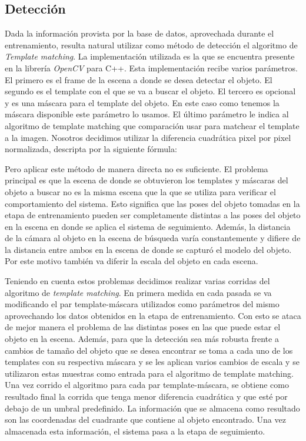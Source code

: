 \subsection{Detección}
Dada la información provista por la base de datos, aprovechada durante el entrenamiento, resulta natural utilizar como método de detección el algoritmo de \textit{Template matching}.  La implementación utilizada es la que se encuentra presente en la librería \textit{OpenCV} para C++. Esta implementación recibe varios parámetros. El primero es el frame de la escena a donde se desea detectar el objeto. El segundo es el template con el que se va a buscar el objeto. El tercero es opcional y es una máscara para el template del objeto. En este caso como tenemos la máscara disponible este parámetro lo usamos. El último parámetro le indica al algoritmo de template matching que comparación usar para matchear el template a la imagen. Nosotros decidimos utilizar la diferencia cuadrática pixel por pixel normalizada, descripta por la siguiente fórmula:


Pero aplicar este método de manera directa no es suficiente. El problema principal es que la escena de donde se obtuvieron los templates y máscaras del objeto a buscar no es la misma escena que la que se utiliza para verificar el comportamiento del sistema. Esto significa que las poses del objeto tomadas en la etapa de entrenamiento pueden ser completamente distintas a las poses del objeto en la escena en donde se aplica el sistema de seguimiento. Además, la distancia de la cámara al objeto en la escena de búsqueda varía constantemente y difiere de la distancia entre ambos en la escena de donde se capturó el modelo del objeto. Por este motivo también va diferir la escala del objeto en cada escena.

Teniendo en cuenta estos problemas decidimos realizar varias corridas del algoritmo de \textit{template matching}. En primera medida en cada pasada se va modificando el par template-máscara utilizados como parámetros del mismo aprovechando los datos obtenidos en la etapa de entrenamiento. Con esto se ataca de mejor manera el problema de las distintas poses en las que puede estar el objeto en la escena. Además, para que la detección sea más robusta frente a cambios de tamaño del objeto que se desea encontrar se toma a cada uno de los templates con su respectiva máscara y se les aplican varios cambios de escala y se utilizaron estas muestras como entrada para el algoritmo de template matching. Una vez corrido el algoritmo para cada par template-máscara, se obtiene como resultado final la corrida que tenga menor diferencia cuadrática y que esté por debajo de un umbral predefinido. La información que se almacena como resultado son las coordenadas del cuadrante que contiene al objeto encontrado. Una vez almacenada esta información, el sistema pasa a la etapa de seguimiento.

